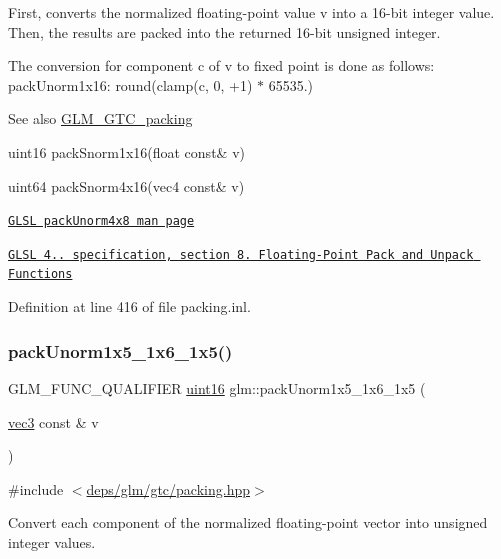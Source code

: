 First, converts the normalized floating-\/point value v into a 16-\/bit integer value. Then, the results are packed into the returned 16-\/bit unsigned integer.

The conversion for component c of v to fixed point is done as follows\+: pack\+Unorm1x16\+: round(clamp(c, 0, +1) $\ast$ 65535.)

\begin{DoxySeeAlso}{See also}
\hyperlink{group__gtc__packing}{G\+L\+M\+\_\+\+G\+T\+C\+\_\+packing} 

uint16 pack\+Snorm1x16(float const\& v) 

uint64 pack\+Snorm4x16(vec4 const\& v) 

\href{http://www.opengl.org/sdk/docs/manglsl/xhtml/packUnorm4x8.xml}{\tt G\+L\+SL pack\+Unorm4x8 man page} 

\href{http://www.opengl.org/registry/doc/GLSLangSpec.4.20.8.pdf}{\tt G\+L\+SL 4.. specification, section 8. Floating-\/\+Point Pack and Unpack Functions} 
\end{DoxySeeAlso}


Definition at line 416 of file packing.\+inl.

\mbox{\label{group__gtc__packing_ga0fcb493167d540aca105d11df5c55503}} 
\subsubsection{\texorpdfstring{pack\+Unorm1x5\+\_\+1x6\+\_\+1x5()}{packUnorm1x5\_1x6\_1x5()}}
{\footnotesize\ttfamily G\+L\+M\+\_\+\+F\+U\+N\+C\+\_\+\+Q\+U\+A\+L\+I\+F\+I\+ER \hyperlink{group__gtc__type__precision_gad8c2939e1fdd8e5828b31d95c52255d5}{uint16} glm\+::pack\+Unorm1x5\+\_\+1x6\+\_\+1x5 (\begin{DoxyParamCaption}\item[{\hyperlink{group__core__types_ga1c47e8b3386109bc992b6c48e91b0be7}{vec3} const \&}]{v }\end{DoxyParamCaption})}



{\ttfamily \#include $<$\hyperlink{gtc_2packing_8hpp}{deps/glm/gtc/packing.\+hpp}$>$}

Convert each component of the normalized floating-\/point vector into unsigned integer values.

